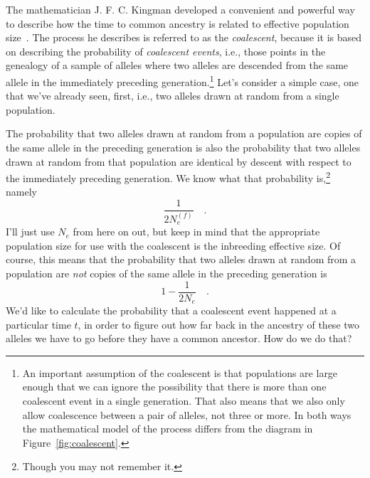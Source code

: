 The mathematician J. F. C. Kingman developed a convenient and powerful
way to describe how the time to common ancestry is related to
effective population
size~\cite{Kingman-1982-genealogy,Kingman-1982-coalescent}. The
process he describes is referred to as the {\it coalescent}, because
it is based on describing the probability of {\it coalescent
  events}, i.e., those points in the
genealogy of a sample of alleles where two alleles are descended from
the same allele in the immediately preceding generation.\footnote{An
  important assumption of the coalescent is that populations are large
  enough that we can ignore the possibility that there is more than
  one coalescent event in a single generation. That also means that we
  also only allow coalescence between a pair of alleles, not three or
  more. In both ways the mathematical model of the process differs
  from the diagram in Figure~\ref{fig:coalescent}.}  Let's consider a
simple case, one that we've already seen, first, i.e., two alleles
drawn at random from a single population.

The probability that two alleles drawn at random from a population are
copies of the same allele in the preceding generation is also the
probability that two alleles drawn at random from that population are
identical by descent with respect to the immediately preceding
generation. We know what that probability is,\footnote{Though you may
not remember it.} namely
\[
\frac{1}{2N_e^{(f)}} \quad .
\]
I'll just use $N_e$ from here on out, but keep in mind that the
appropriate population size for use with the coalescent is the
inbreeding effective size. Of course, this means that the probability
that two alleles drawn at random from a population are {\it not\/}
copies of the same allele in the preceding generation is
\[
1 - \frac{1}{2N_e} \quad .
\]
We'd like to calculate the probability that a coalescent event
happened at a particular time $t$, in order to figure out how far back
in the ancestry of these two alleles we have to go before they have a
common ancestor. How do we do that?

